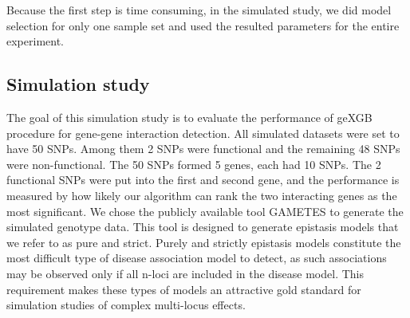 \documentclass[11pt]{article}
\theoremstyle{plain}
\theoremstyle{definition}
\theoremstyle{remark}
\begin{document}
Because the first step is time consuming, in the simulated study, we did model selection for only one sample set and used the resulted parameters for the entire experiment.







\subsection{Simulation study}

The goal of this simulation study is to evaluate the performance of geXGB procedure for gene-gene interaction detection. All simulated datasets were set to have 50 SNPs. Among them 2 SNPs were functional and the remaining 48 SNPs were non-functional. The 50 SNPs formed 5 genes, each had 10 SNPs. The 2 functional SNPs were put into the first and second gene, and the performance is measured by how likely our algorithm can rank the two interacting genes as the most significant. We chose the publicly available tool GAMETES \cite{11} to generate the simulated genotype data. This tool is designed to generate epistasis models that we refer to as pure and strict. Purely and strictly epistasis models constitute the most difficult type of disease association model to detect, as such associations may be observed only if all n-loci are included in the disease model. This requirement makes these types of models an attractive gold standard for simulation studies of complex multi-locus effects. \\
\end{document}
